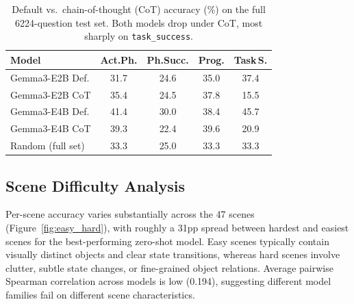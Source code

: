 \begin{table}[t]
  \centering
  \caption{Default vs.\ chain-of-thought (CoT) accuracy (\%) on the full 6224-question
  test set. Both models drop under CoT, most sharply on \texttt{task\_success}.}
  \label{tab:cot_results}
  \setlength{\tabcolsep}{4pt}
  \begin{tabular}{l|cccc}
    \toprule
    \textbf{Model} & \textbf{Act.Ph.} & \textbf{Ph.Succ.} & \textbf{Prog.} & \textbf{Task\,S.} \\
    \midrule
    Gemma3-E2B Def. & 31.7 & 24.6 & 35.0 & 37.4 \\
    Gemma3-E2B CoT      & 35.4 & 24.5 & 37.8 & 15.5 \\
    \midrule
    Gemma3-E4B Def. & 41.4 & 30.0 & 38.4 & 45.7 \\
    Gemma3-E4B CoT      & 39.3 & 22.4 & 39.6 & 20.9 \\
    \midrule
    Random (full set) & 33.3 & 25.0 & 33.3 & 33.3 \\
    \bottomrule
  \end{tabular}
\end{table}

\subsection{Scene Difficulty Analysis}
Per-scene accuracy varies substantially across the 47 scenes (Figure~\ref{fig:easy_hard}), with roughly a 31pp spread between hardest and easiest scenes for the best-performing zero-shot model. Easy scenes typically contain visually distinct objects and clear state transitions, whereas hard scenes involve clutter, subtle state changes, or fine-grained object relations. Average pairwise Spearman correlation across models is low (0.194), suggesting different model families fail on different scene characteristics.

